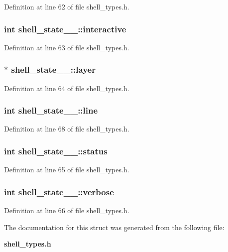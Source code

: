 Definition at line 62 of file shell\_\-types.h.
\subsubsection[{interactive}]{\setlength{\rightskip}{0pt plus 5cm}int {\bf shell\_\-state\_\-\_\-::interactive}}\label{structshell__state_____c19530794ea54d353fd0311833918b58}




Definition at line 63 of file shell\_\-types.h.
\subsubsection[{layer}]{$\ast$ {\bf shell\_\-state\_\-\_\-::layer}}\label{structshell__state_____6d0f8ff17a863ff9b78024b332d4f002}




Definition at line 64 of file shell\_\-types.h.
\subsubsection[{line}]{\setlength{\rightskip}{0pt plus 5cm}int {\bf shell\_\-state\_\-\_\-::line}}\label{structshell__state_____f791667e865551ff1ef99e5bd7fb5ebd}




Definition at line 68 of file shell\_\-types.h.
\subsubsection[{status}]{\setlength{\rightskip}{0pt plus 5cm}int {\bf shell\_\-state\_\-\_\-::status}}\label{structshell__state_____ecc070dc56b42065153b28df3b48731d}




Definition at line 65 of file shell\_\-types.h.
\subsubsection[{verbose}]{\setlength{\rightskip}{0pt plus 5cm}int {\bf shell\_\-state\_\-\_\-::verbose}}\label{structshell__state_____f1e01f5e2ea55d14d3e2dbafb9313262}




Definition at line 66 of file shell\_\-types.h.

The documentation for this struct was generated from the following file:\begin{CompactItemize}
\item 
{\bf shell\_\-types.h}\end{CompactItemize}

